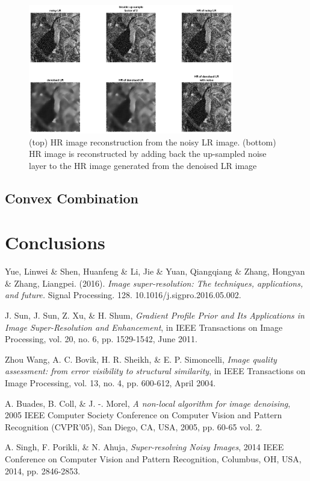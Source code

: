 \documentclass[a4paper,11pt]{article}
\begin{document}
\begin{figure}[H]
	\centering
	\includegraphics[width=0.8\textwidth]{simple denoise.png}
	\caption{(top) HR image reconstruction from the noisy LR image. (bottom) HR image is reconstructed by adding back the up-sampled noise layer to the HR image generated from the denoised LR image}
	\label{fig:sden}
\end{figure}

\subsection{Convex Combination}


\section{Conclusions}


\begin{thebibliography}{10}

 {\sc Yue, Linwei \& Shen, Huanfeng \& Li, Jie \& Yuan, Qiangqiang \& Zhang, Hongyan \& Zhang, Liangpei.} (2016). {\em Image super-resolution: The techniques, applications, and future.} Signal Processing. 128. 10.1016/j.sigpro.2016.05.002. 

 {\sc J. Sun, J. Sun, Z. Xu, \& H. Shum}, {\em Gradient Profile Prior and Its Applications in Image Super-Resolution and Enhancement}, in IEEE Transactions on Image Processing, vol. 20, no. 6, pp. 1529-1542, June 2011.

 {\sc Zhou Wang, A. C. Bovik, H. R. Sheikh, \& E. P. Simoncelli}, {\em Image quality assessment: from error visibility to structural similarity}, in IEEE Transactions on Image Processing, vol. 13, no. 4, pp. 600-612, April 2004.

 {\sc A. Buades, B. Coll, \& J. -. Morel}, {\em A non-local algorithm for image denoising}, 2005 IEEE Computer Society Conference on Computer Vision and Pattern Recognition (CVPR'05), San Diego, CA, USA, 2005, pp. 60-65 vol. 2.

 {\sc A. Singh, F. Porikli, \& N. Ahuja}, {\em Super-resolving Noisy Images}, 2014 IEEE Conference on Computer Vision and Pattern Recognition, Columbus, OH, USA, 2014, pp. 2846-2853.

\end{thebibliography}
\end{document}
